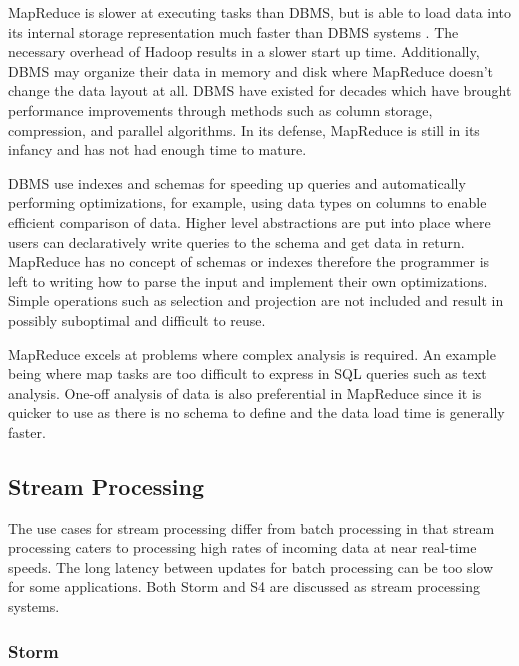 \documentclass[12pt]{article}
\begin{document}
MapReduce is slower at executing tasks than DBMS, but is able to load data into its internal storage representation much faster than DBMS systems \cite{pavlo2009mapreduce}. The necessary overhead of Hadoop results in a slower start up time. Additionally, DBMS may organize their data in memory and disk where MapReduce doesn't change the data layout at all. DBMS have existed for decades which have brought performance improvements through methods such as column storage, compression, and parallel algorithms. In its defense, MapReduce is still in its infancy and has not had enough time to mature.

DBMS use indexes and schemas for speeding up queries and automatically performing optimizations, for example, using data types on columns to enable efficient comparison of data. Higher level abstractions are put into place where users can declaratively write queries to the schema and get data in return. MapReduce has no concept of schemas or indexes therefore the programmer is left to writing how to parse the input and implement their own optimizations. Simple operations such as selection and projection are not included and result in possibly suboptimal and difficult to reuse.

MapReduce excels at problems where complex analysis is required. An example being where map tasks are too difficult to express in SQL queries such as text analysis. One-off analysis of data is also preferential in MapReduce since it is quicker to use as there is no schema to define and the data load time is generally faster.





\subsection{Stream Processing} \label{sub:stream}


The use cases for stream processing differ from batch processing in that stream processing caters to processing high rates of incoming data at near real-time speeds. The long latency between updates for batch processing can be too slow for some applications. Both Storm and S4 are discussed as stream processing systems.

\subsubsection{Storm}
\end{document}
